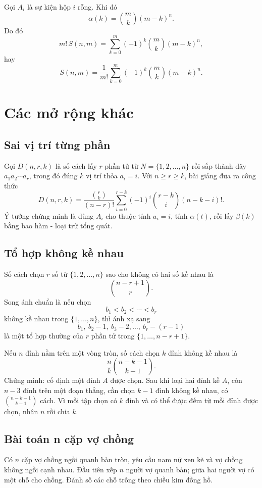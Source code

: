 \documentclass[11pt]{article}
\newcommand{\C}[2]{\binom{#1}{#2}}
\begin{document}
Gọi \(A_i\) là sự kiện hộp \(i\) rỗng. Khi đó
\[
  \alpha(k)=\C mk(m-k)^n.
\]
Do đó
\[
  m!\,S(n,m)
  =
  \sum_{k=0}^m (-1)^k\C mk(m-k)^n,
\]
hay
\[
  S(n,m)=\frac1{m!}\sum_{k=0}^m(-1)^k\C mk(m-k)^n.
\]

\section{Các mở rộng khác}

\subsection{Sai vị trí từng phần}

Gọi \(D(n,r,k)\) là số cách lấy \(r\) phần tử từ \(N=\{1,2,\ldots,n\}\) rồi
sắp thành dãy \(a_1a_2\cdots a_r\), trong đó đúng \(k\) vị trí thỏa
\(a_i=i\). Với \(n\ge r\ge k\), bài giảng đưa ra công thức
\[
  D(n,r,k)
  =
  \frac{\C rk}{(n-r)!}
  \sum_{i=0}^{r-k}(-1)^i\C{r-k}{i}(n-k-i)!.
\]
Ý tưởng chứng minh là dùng \(A_i\) cho thuộc tính \(a_i=i\), tính
\(\alpha(t)\), rồi lấy \(\beta(k)\) bằng bao hàm - loại trừ tổng quát.

\subsection{Tổ hợp không kề nhau}

Số cách chọn \(r\) số từ \(\{1,2,\ldots,n\}\) sao cho không có hai số kề nhau
là
\[
  \C{n-r+1}{r}.
\]
Song ánh chuẩn là nếu chọn
\[
  b_1<b_2<\cdots<b_r
\]
không kề nhau trong \(\{1,\ldots,n\}\), thì ánh xạ sang
\[
  b_1,\ b_2-1,\ b_3-2,\ldots,\ b_r-(r-1)
\]
là một tổ hợp thường của \(r\) phần tử trong \(\{1,\ldots,n-r+1\}\).

Nếu \(n\) đỉnh nằm trên một vòng tròn, số cách chọn \(k\) đỉnh không kề nhau
là
\[
  \frac{n}{k}\C{n-k-1}{k-1}.
\]
Chứng minh: cố định một đỉnh \(A\) được chọn. Sau khi loại hai đỉnh kề \(A\),
còn \(n-3\) đỉnh trên một đoạn thẳng, cần chọn \(k-1\) đỉnh không kề nhau, có
\(\C{n-k-1}{k-1}\) cách. Vì mỗi tập chọn có \(k\) đỉnh và có thể được đếm từ
mỗi đỉnh được chọn, nhân \(n\) rồi chia \(k\).

\subsection{Bài toán n cặp vợ chồng}

Có \(n\) cặp vợ chồng ngồi quanh bàn tròn, yêu cầu nam nữ xen kẽ và vợ chồng
không ngồi cạnh nhau. Đầu tiên xếp \(n\) người vợ quanh bàn; giữa hai người
vợ có một chỗ cho chồng. Đánh số các chỗ trống theo chiều kim đồng hồ.
\end{document}
